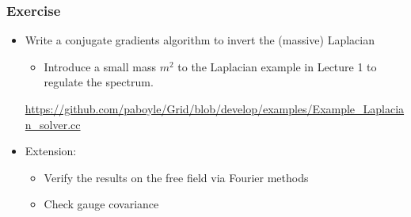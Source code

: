 \documentclass[pdf,ps,8pt]{beamer}
\begin{document}
\begin{frame}[fragile]\small\frametitle{ Exercise}

\begin{itemize}
\item Write a conjugate gradients algorithm to invert the (massive) Laplacian
\begin{itemize}
\item Introduce a small mass $m^2$ to the Laplacian example in Lecture 1 to regulate the spectrum.
\end{itemize}
\href{https://github.com/paboyle/Grid/blob/develop/examples/Example_Laplacian_solver.cc}
     {\color{blue} https://github.com/paboyle/Grid/blob/develop/examples/Example\_Laplacian\_solver.cc}
\item Extension:
\begin{itemize}
\item Verify the results on the free field via Fourier methods
\item Check gauge covariance
\end{itemize}
\end{itemize}

\end{frame}
\end{document}
